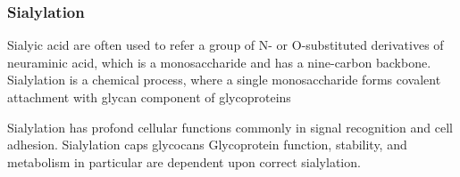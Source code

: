 \subsubsection {Sialylation}
Sialyic acid are often used to refer a group of N- or O-substituted derivatives of neuraminic acid, which is a monosaccharide and has a nine-carbon backbone.~\cite{Vocadlo_2009} Sialylation is a chemical process, where a single monosaccharide forms covalent attachment with glycan component of glycoproteins

Sialylation has profond cellular functions commonly in signal recognition and cell adhesion. Sialylation caps glycocans Glycoprotein function, stability, and metabolism in particular are dependent upon correct sialylation.